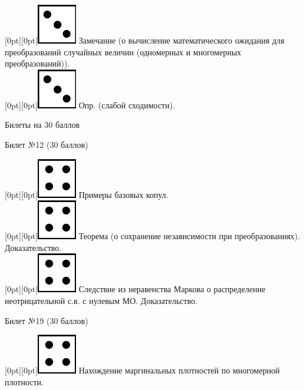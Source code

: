 \documentclass[10pt]{article}
\begin{document}
\raisebox{-1pt}[0pt][0pt]{\includegraphics[width=0.02\linewidth]{3.png}} Замечание (о вычисление  математического ожидания для преобразований случайных величин (одномерных и многомерных преобразований)). \\

\raisebox{-1pt}[0pt][0pt]{\includegraphics[width=0.02\linewidth]{3.png}} Опр. (слабой сходимости). \\





\begin{center}

    Билеты на 30 баллов

\end{center}





\begin{center} {\Large Билет №12 (30 баллов)} \end{center}

\raisebox{-1pt}[0pt][0pt]{\includegraphics[width=0.02\linewidth]{4.png}} Примеры базовых копул. \\

\raisebox{-1pt}[0pt][0pt]{\includegraphics[width=0.02\linewidth]{4.png}} Теорема (о сохранение независимости при преобразованиях). Доказательство. \\ 

\raisebox{-1pt}[0pt][0pt]{\includegraphics[width=0.02\linewidth]{4.png}} Следствие из неравенства Маркова о распределение неотрицательной с.в. с нулевым МО. Доказательство. \\

\begin{center} {\Large Билет №19 (30 баллов)} \end{center}

\raisebox{-1pt}[0pt][0pt]{\includegraphics[width=0.02\linewidth]{4.png}} Нахождение маргинальных плотностей по многомерной плотности. \\
\end{document}
